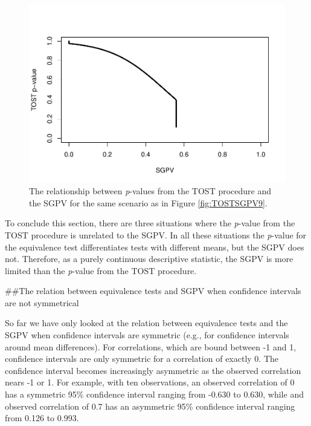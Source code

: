 \documentclass[,man,floatsintext]{apa6}
\begin{document}
\begin{figure}
\centering
\includegraphics{manuscript_files/figure-latex/TOSTSGPV10-1.pdf}
\caption{\label{fig:TOSTSGPV10}The relationship between \emph{p}-values from the TOST procedure and the SGPV for the same scenario as in Figure \ref{fig:TOSTSGPV9}.}
\end{figure}

To conclude this section, there are three situations where the \emph{p}-value from the TOST procedure is unrelated to the SGPV. In all these situations the \emph{p}-value for the equivalence test differentiates tests with different means, but the SGPV does not. Therefore, as a purely continuous descriptive statistic, the SGPV is more limited than the \emph{p}-value from the TOST procedure.

\#\#The relation between equivalence tests and SGPV when confidence intervals are not symmetrical

So far we have only looked at the relation between equivalence tests and the SGPV when confidence intervals are symmetric (e.g., for confidence intervals around mean differences). For correlations, which are bound between -1 and 1, confidence intervals are only symmetric for a correlation of exactly 0. The confidence interval becomes increasingly asymmetric as the observed correlation nears -1 or 1. For example, with ten observations, an observed correlation of 0 has a symmetric 95\% confidence interval ranging from -0.630 to 0.630, while and observed correlation of 0.7 has an asymmetric 95\% confidence interval ranging from 0.126 to 0.993.
\end{document}
